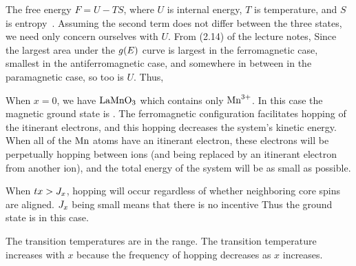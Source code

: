 \documentclass[11pt]{article}
\begin{document}
{	The free energy $F = U - T S$, where $U$ is internal energy, $T$ is temperature, and $S$ is entropy~\cite[p.~48]{Landau}.  Assuming the second term does not differ between the three states, we need only concern ourselves with $U$.  From (2.14) of the lecture notes,
	Since the largest area under the $g(E)$ curve is largest in the ferromagnetic case, smallest in the antiferromagnetic case, and somewhere in between in the paramagnetic case, so too is $U$.  Thus,
	
	When $x = 0$, we have $\text{La} \text{Mn} \text{O}_3$ which contains only $\text{Mn}^{3+}$.  In this case the magnetic ground state is .  The ferromagnetic configuration facilitates hopping of the itinerant electrons, and this hopping decreases the system's kinetic energy.  When all of the $\text{Mn}$ atoms have an itinerant electron, these electrons will be perpetually hopping between ions (and being replaced by an itinerant electron from another ion), and the total energy of the system will be as small as possible.
	
	When $t x > J_x$, hopping will occur regardless of whether neighboring core spins are aligned.  $J_x$ being small means that there is no incentive   Thus the ground state is  in this case.
	
	The transition temperatures are in the  range.  The transition temperature increases with $x$ because the frequency of hopping decreases as $x$ increases.
}


\end{document}
